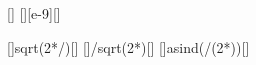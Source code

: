 [\electronvolt]
[\nano\m][e-9][\m]

[]{sqrt(2*\EkX*\nceX/\ncmnX)}[\mps]
[]{\nchX/sqrt(2*\ncmnX*\EkX*\nceX)}[\m]
[\arcsin{}]{asind(\laX/(2*\dX))}[\degree]
